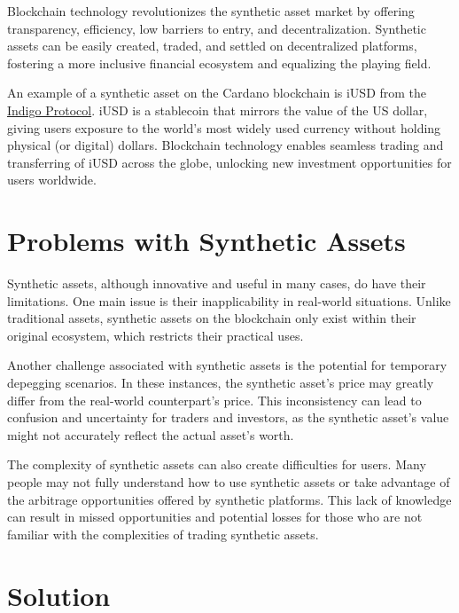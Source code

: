 Blockchain technology revolutionizes the synthetic asset market by
offering transparency, efficiency, low barriers to entry, and
decentralization. Synthetic assets can be easily created, traded, and
settled on decentralized platforms, fostering a more inclusive financial
ecosystem and equalizing the playing field.

An example of a synthetic asset on the Cardano blockchain is iUSD from
the \href{https://indigoprotocol.io/}{Indigo Protocol}. iUSD is a
stablecoin that mirrors the value of the US dollar, giving users
exposure to the world's most widely used currency without holding
physical (or digital) dollars. Blockchain technology enables seamless
trading and transferring of iUSD across the globe, unlocking new
investment opportunities for users worldwide.

\hypertarget{problems-with-synthetic-assets}{%
\section{Problems with Synthetic
Assets}\label{problems-with-synthetic-assets}}

Synthetic assets, although innovative and useful in many cases, do have
their limitations. One main issue is their inapplicability in real-world
situations. Unlike traditional assets, synthetic assets on the
blockchain only exist within their original ecosystem, which restricts
their practical uses.

Another challenge associated with synthetic assets is the potential for
temporary depegging scenarios. In these instances, the synthetic asset's
price may greatly differ from the real-world counterpart's price. This
inconsistency can lead to confusion and uncertainty for traders and
investors, as the synthetic asset's value might not accurately reflect
the actual asset's worth.

The complexity of synthetic assets can also create difficulties for
users. Many people may not fully understand how to use synthetic assets
or take advantage of the arbitrage opportunities offered by synthetic
platforms. This lack of knowledge can result in missed opportunities and
potential losses for those who are not familiar with the complexities of
trading synthetic assets.

\hypertarget{solution}{%
\section{Solution}\label{solution}}

